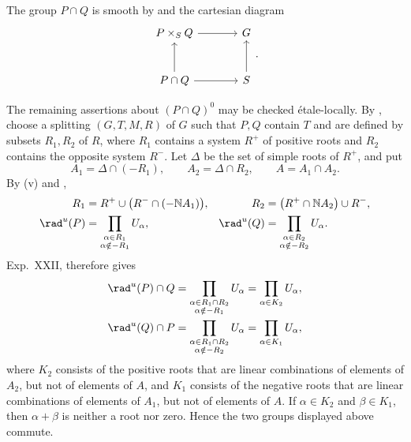 \SGAProof
The group \(P\cap Q\) is smooth by \textup{} and the
cartesian diagram
\[
\begin{tikzcd}[column sep=large,row sep=large]
 P\times_SQ \arrow[r] & G\\
 P\cap Q \arrow[u] \arrow[r] & S\arrow[u]
\end{tikzcd}.
\]

The remaining assertions about \((P\cap Q)^0\) may be checked
étale-locally.  By \textup{}, choose a splitting
\((G,T,M,R)\) of \(G\) such that \(P,Q\) contain \(T\) and are defined
by subsets \(R_1,R_2\) of \(R\), where \(R_1\) contains a system
\(R^+\) of positive roots and \(R_2\) contains the opposite system
\(R^-\).  Let \(\Delta\) be the set of simple roots of \(R^+\), and put
\[
 A_1=\Delta\cap(-R_1),\qquad
 A_2=\Delta\cap R_2,\qquad
 A=A_1\cap A_2.
\]
By \textup{(v)} and ,
\[
\begin{aligned}
 R_1&=R^+\cup\bigl(R^-\cap(-\mathbb N A_1)\bigr),&
 R_2&=\bigl(R^+\cap\mathbb N A_2\bigr)\cup R^-,\\
 \rad^u(P)&=
   \prod_{\substack{\alpha\in R_1\\\alpha\notin-R_1}}U_\alpha,&
 \rad^u(Q)&=
   \prod_{\substack{\alpha\in R_2\\\alpha\notin-R_2}}U_\alpha.
\end{aligned}
\]
Exp.\ XXII,  therefore gives
\[
\begin{aligned}
 \rad^u(P)\cap Q
  &=
  \prod_{\substack{\alpha\in R_1\cap R_2\\\alpha\notin-R_1}}U_\alpha
  =\prod_{\alpha\in K_2}U_\alpha,\\
 \rad^u(Q)\cap P
  &=
  \prod_{\substack{\alpha\in R_1\cap R_2\\\alpha\notin-R_2}}U_\alpha
  =\prod_{\alpha\in K_1}U_\alpha,
\end{aligned}
\]
where \(K_2\) consists of the positive roots that are linear
combinations of elements of \(A_2\), but not of elements of \(A\), and
\(K_1\) consists of the negative roots that are linear combinations of
elements of \(A_1\), but not of elements of \(A\).  If
\(\alpha\in K_2\) and \(\beta\in K_1\), then \(\alpha+\beta\) is neither
a root nor zero.  Hence the two groups displayed above commute.

